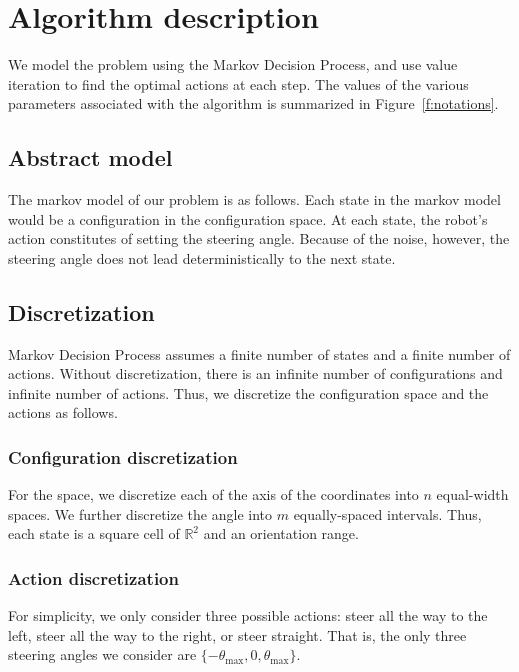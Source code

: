 \documentclass[a4paper]{article}
\begin{document}
\section{Algorithm description}
We model the problem using the Markov Decision Process, and use value iteration
to find the optimal actions at each step.
The values of the various parameters associated with the algorithm is
summarized in Figure~\ref{f:notations}.

\subsection{Abstract model}

The markov model of our problem is as follows. Each state in the markov model
would be a configuration in the configuration space. At each state, the robot's
action constitutes of setting the steering angle. Because of the noise, however,
the steering angle does not lead deterministically to the next state.

\subsection{Discretization}
Markov Decision Process assumes a finite number of states and a finite number
of actions. Without discretization, there is an infinite number of
configurations and infinite number of actions. Thus, we discretize the configuration
space and the actions as follows.

\subsubsection{Configuration discretization}
For the space, we discretize each of the axis of the coordinates into $n$
equal-width spaces. We further discretize the angle into $m$ equally-spaced
intervals. Thus, each state is a square cell of $\mathbb{R}^2$ and an orientation
range.

\subsubsection{Action discretization}
For simplicity, we only consider three possible actions: steer all the way
to the left, steer all the way to the right, or steer straight. That is,
the only three steering angles we consider are $\{-\theta_\text{max}, 0, \theta_\text{max}\}$.
\end{document}
